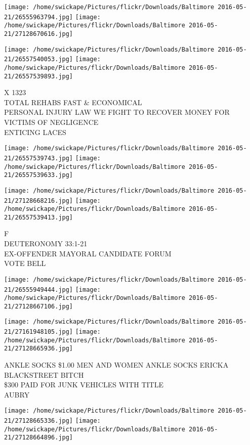 \documentclass[10pt,letterpaper]{article}
\begin{document}
\texttt{[image: /home/swickape/Pictures/flickr/Downloads/Baltimore 2016-05-21/26555963794.jpg]}
\texttt{[image: /home/swickape/Pictures/flickr/Downloads/Baltimore 2016-05-21/27128670616.jpg]}

\texttt{[image: /home/swickape/Pictures/flickr/Downloads/Baltimore 2016-05-21/26557540053.jpg]}
\texttt{[image: /home/swickape/Pictures/flickr/Downloads/Baltimore 2016-05-21/26557539893.jpg]}

X 1323\\
TOTAL REHABS FAST \& ECONOMICAL\\
PERSONAL INJURY LAW WE FIGHT TO RECOVER MONEY FOR VICTIMS OF NEGLIGENCE\\
ENTICING LACES
\pagebreak

\texttt{[image: /home/swickape/Pictures/flickr/Downloads/Baltimore 2016-05-21/26557539743.jpg]}
\texttt{[image: /home/swickape/Pictures/flickr/Downloads/Baltimore 2016-05-21/26557539633.jpg]}

\texttt{[image: /home/swickape/Pictures/flickr/Downloads/Baltimore 2016-05-21/27128668216.jpg]}
\texttt{[image: /home/swickape/Pictures/flickr/Downloads/Baltimore 2016-05-21/26557539413.jpg]}

F\\
DEUTERONOMY 33:1{-}21\\
EX{-}OFFENDER MAYORAL CANDIDATE FORUM\\
VOTE BELL
\pagebreak

\texttt{[image: /home/swickape/Pictures/flickr/Downloads/Baltimore 2016-05-21/26555949444.jpg]}
\texttt{[image: /home/swickape/Pictures/flickr/Downloads/Baltimore 2016-05-21/27128667106.jpg]}

\texttt{[image: /home/swickape/Pictures/flickr/Downloads/Baltimore 2016-05-21/27161948105.jpg]}
\texttt{[image: /home/swickape/Pictures/flickr/Downloads/Baltimore 2016-05-21/27128665936.jpg]}

ANKLE SOCKS \$1.00 MEN AND WOMEN ANKLE SOCKS ERICKA\\
BLACKSTREET BITCH\\
\$300 PAID FOR JUNK VEHICLES WITH TITLE\\
AUBRY
\pagebreak

\texttt{[image: /home/swickape/Pictures/flickr/Downloads/Baltimore 2016-05-21/27128665336.jpg]}
\texttt{[image: /home/swickape/Pictures/flickr/Downloads/Baltimore 2016-05-21/27128664896.jpg]}
\end{document}
